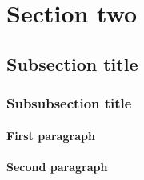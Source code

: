 \section{Section two}\label{sec:section2}

\lipsum[1-1]

\subsection{Subsection title}\label{subsec:title}
\lipsum[2-2]
\subsubsection{Subsubsection title}\label{subsubsec:title}
\lipsum[3-3]
\paragraph{First paragraph}
\lipsum[4-4]
\paragraph{Second paragraph}
\lipsum[5-5]
